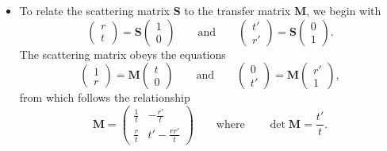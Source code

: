 \documentclass[11pt, a4paper]{article}
\newcommand{\mat}[1]{\mathbf{#1}}  %
\renewcommand{\SS}{\mat{S}}  %
\newcommand{\M}{\mat{M}}  %
\begin{document}
\begin{itemize}
    \item To relate the scattering matrix $ \SS $ to the transfer matrix $ \M $, we begin with
    \begin{equation*}
        \begin{pmatrix}
            r\\
            t
        \end{pmatrix} 
        = \SS
        \begin{pmatrix}
            1\\
            0
        \end{pmatrix}
        \qquad \text{and} \qquad 
        \begin{pmatrix}
            t'\\
            r'
        \end{pmatrix}
        = \SS
        \begin{pmatrix}
            0\\
            1
        \end{pmatrix}.
    \end{equation*}
    The scattering matrix obeys the equations
    \begin{equation*}
        \begin{pmatrix}
            1 \\
            r
        \end{pmatrix}
        = \M
        \begin{pmatrix}
            t\\
            0
        \end{pmatrix}
        \qquad \text{and} \qquad 
        \begin{pmatrix}
            0\\
            t'
        \end{pmatrix}
        = \M
        \begin{pmatrix}
            r'\\
            1
        \end{pmatrix},
    \end{equation*}
    from which follows the relationship
    \begin{equation*}
        \M = 
        \begin{pmatrix}
            \frac{1}{t} & - \frac{r'}{t}\\
            \frac{r}{t} & t' - \frac{rr'}{t}
        \end{pmatrix}
        \qquad \text{where} \qquad \det \M = \frac{t'}{t}.
    \end{equation*}

\end{itemize}
\end{document}
